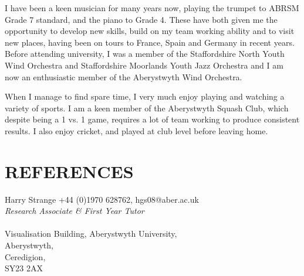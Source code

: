 \documentclass[line,margin]{res}
\begin{document}
\begin{resume}
I have been a keen musician for many years now, playing the trumpet to ABRSM Grade 7
standard, and the piano to Grade 4. These have both given me the opportunity to develop new
skills, build on my team working ability and to visit new places, having been on tours to
France, Spain and Germany in recent years. Before attending university, I was a member of
the Staffordshire North Youth Wind Orchestra and Staffordshire Moorlands Youth Jazz
Orchestra and I am now an enthusiastic member of the Aberystwyth Wind Orchestra.

When I manage to find spare time, I very much enjoy playing and
watching a variety of sports. I am a keen member of the Aberystwyth Squash Club, which
despite being a 1 vs. 1 game, requires a lot of team working to produce consistent
results. I also enjoy cricket, and played at club level before leaving home.

\section{REFERENCES}Harry Strange \hfill +44 (0)1970 628762, hgs08@aber.ac.uk\\
{\sl Research Associate \& First Year Tutor}\\ \\
Visualisation Building, Aberystwyth University, \\Aberystwyth, \\Ceredigion, \\SY23 2AX

\end{resume}
\end{document}
